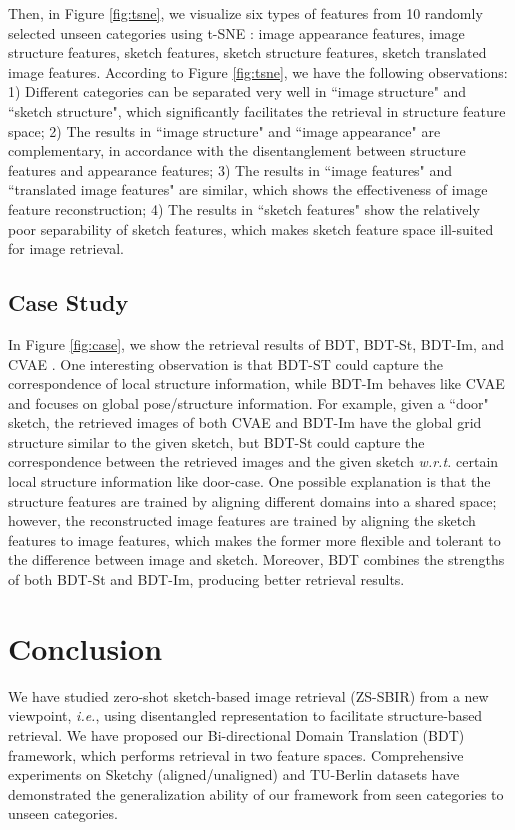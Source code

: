 \documentclass[10pt,twocolumn,letterpaper]{article}
\begin{document}
Then, in Figure \ref{fig:tsne}, we visualize six types of features from 10 randomly selected unseen categories using t-SNE \cite{maaten2008visualizing}: image appearance features, image structure features, sketch features, sketch structure features, sketch translated image features. According to Figure \ref{fig:tsne}, we have the following observations: 1) Different categories can be separated very well in ``image structure" and ``sketch structure", which significantly facilitates the retrieval in structure feature space; 2) The results in ``image structure" and ``image appearance" are complementary, in accordance with the disentanglement between structure features and appearance features; 3) The results in ``image features" and ``translated image features" are similar, which shows the effectiveness of image feature reconstruction; 4) The results in ``sketch features" show the relatively poor separability of sketch features, which makes sketch feature space ill-suited for image retrieval.

\subsection{Case Study}
In Figure \ref{fig:case}, we show the retrieval results of BDT, BDT-St, BDT-Im, and CVAE \cite{yelamarthi2018zero}. One interesting observation is that BDT-ST could capture the correspondence of local structure information, while BDT-Im behaves like CVAE and focuses on global pose/structure information. For example, given a ``door" sketch, the retrieved images of both CVAE and BDT-Im have the global grid structure similar to the given sketch, but BDT-St could capture the correspondence between the retrieved images and the given sketch \emph{w.r.t.} certain local structure information like door-case.
One possible explanation is that the structure features are trained by aligning different domains into a shared space; however, the reconstructed image features are trained by aligning the sketch features to image features, which makes the former more flexible and tolerant to the difference between image and sketch. 
Moreover, BDT combines the strengths of both BDT-St and BDT-Im, producing better retrieval results.


\section{Conclusion}
We have studied zero-shot sketch-based image retrieval (ZS-SBIR) from a new viewpoint, \emph{i.e.}, using disentangled representation to facilitate structure-based retrieval. We have proposed our Bi-directional Domain Translation (BDT) framework, which performs retrieval in two feature spaces. Comprehensive experiments on Sketchy (aligned/unaligned) and TU-Berlin datasets have demonstrated the generalization ability of our framework from seen categories to unseen categories.
\end{document}
